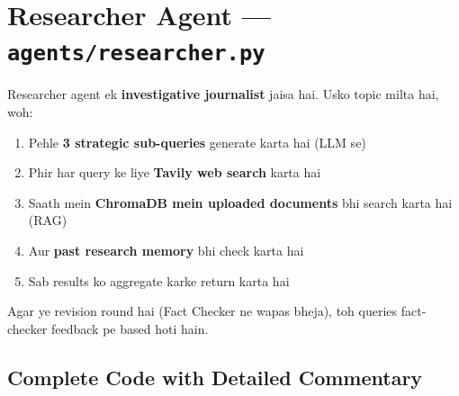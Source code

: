 \documentclass[12pt, a4paper]{article}
\begin{document}
\section{Researcher Agent --- \texttt{agents/researcher.py}}

\begin{storybox}
Researcher agent ek \textbf{investigative journalist} jaisa hai. Usko topic milta hai, woh:
\begin{enumerate}
\item Pehle \textbf{3 strategic sub-queries} generate karta hai (LLM se)
\item Phir har query ke liye \textbf{Tavily web search} karta hai
\item Saath mein \textbf{ChromaDB mein uploaded documents} bhi search karta hai (RAG)
\item Aur \textbf{past research memory} bhi check karta hai
\item Sab results ko aggregate karke return karta hai
\end{enumerate}
Agar ye revision round hai (Fact Checker ne wapas bheja), toh queries fact-checker feedback pe based hoti hain.
\end{storybox}

\subsection{Complete Code with Detailed Commentary}
\end{document}
